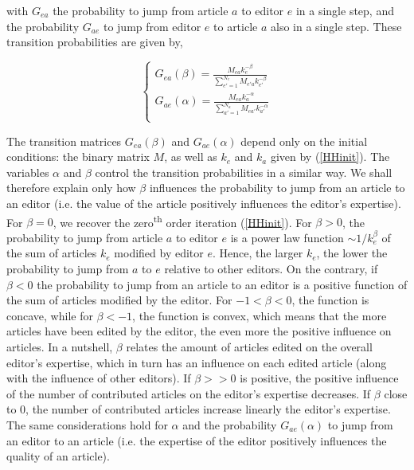 with $G_{ea}$ the probability  to jump from article $a$ to editor $e$ in a single step, and the probability $G_{ae}$ to jump from editor $e$ to article $a$ also in a single step. These transition probabilities are given by,

\begin{equation}
\begin{cases}
G_{ea}(\beta) = \frac{M_{ea} k_{e}^{-\beta}}{\sum_{e' = 1}^{N_e} M_{e'a} k_{e'}^{-\beta}}\\[8pt]
G_{ae}(\alpha) = \frac{M_{ea} k_{a}^{-\alpha}}{\sum_{a' = 1}^{N_a} M_{ea'} k_{a'}^{-\alpha}}\\
 \end{cases}
\end{equation}

The transition matrices $G_{ea}(\beta)$ and $G_{ae}(\alpha)$ depend only on the initial conditions: the binary matrix $M$, as well as $k_e$ and $k_a$ given by (\ref{HHinit}). The variables $\alpha$ and $\beta$ control the transition probabilities in a similar way. We shall therefore explain only how $\beta$ influences the probability to jump from an article to an editor (i.e. the value of the article positively influences the editor's expertise). For $\beta = 0$, we recover the zero\textsuperscript{th} order iteration (\ref{HHinit}). For $\beta > 0$, the probability to jump from article $a$ to editor $e$ is a power law function $\sim 1/k_{e}^{\beta}$ of the sum of articles $k_{e}$  modified by editor $e$. Hence, the larger $k_{e}$, the lower the probability to jump from $a$ to $e$ relative to other editors. On the contrary, if $\beta < 0$ the probability to jump from an article to an editor is a positive function of the sum of articles modified by the editor. For $-1 < \beta < 0$, the function is concave, while for $\beta < -1$, the function is convex, which means that the more articles have been edited by the editor, the even more the positive influence on articles. In a nutshell, $\beta$ relates the amount of articles edited on the overall editor's expertise, which in turn has an influence on each edited article (along with the influence of other editors). If $\beta >> 0$ is positive, the positive influence  of the number of contributed articles on the editor's expertise decreases. If $\beta$ close to $0$, the number of contributed articles increase linearly the editor's expertise. The same considerations hold for $\alpha$ and the probability $G_{ae}(\alpha)$ to jump from an editor to an article (i.e. the expertise of the editor positively influences the quality of an article).

